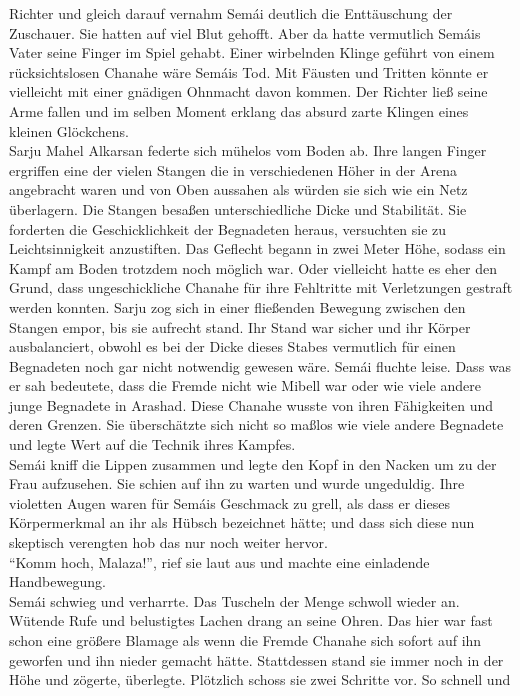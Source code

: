 Richter und gleich darauf vernahm Semái deutlich die Enttäuschung der Zuschauer. Sie hatten auf 
viel Blut gehofft. Aber da hatte vermutlich Semáis Vater seine Finger im Spiel gehabt. Einer 
wirbelnden Klinge geführt von einem rücksichtslosen Chanahe wäre Semáis Tod. Mit Fäusten und 
Tritten könnte er vielleicht mit einer gnädigen Ohnmacht davon kommen. Der Richter ließ seine Arme 
fallen und im selben Moment erklang das absurd zarte Klingen eines kleinen Glöckchens.\\
Sarju Mahel Alkarsan federte sich mühelos vom Boden ab. Ihre langen Finger 
ergriffen eine der vielen Stangen die in verschiedenen Höher in der Arena angebracht waren und von 
Oben aussahen als würden sie sich wie ein Netz überlagern. Die Stangen besaßen unterschiedliche 
Dicke und Stabilität. Sie forderten die Geschicklichkeit der Begnadeten heraus, versuchten sie zu 
Leichtsinnigkeit anzustiften. Das Geflecht begann in zwei Meter Höhe, sodass ein Kampf am Boden 
trotzdem noch möglich war. Oder vielleicht hatte es eher den Grund, dass ungeschickliche Chanahe 
für ihre Fehltritte mit Verletzungen gestraft werden konnten. Sarju zog sich in einer fließenden 
Bewegung zwischen den Stangen empor, bis sie aufrecht stand. Ihr Stand war sicher und ihr Körper 
ausbalanciert, obwohl es bei der Dicke dieses Stabes vermutlich für einen Begnadeten noch gar nicht 
notwendig gewesen wäre. Semái fluchte leise. Dass was er sah bedeutete, dass die Fremde nicht wie 
Mibell war oder wie viele andere junge Begnadete in Arashad. Diese Chanahe wusste von ihren 
Fähigkeiten und deren Grenzen. Sie überschätzte sich nicht so maßlos wie viele andere Begnadete und 
legte Wert auf die Technik ihres Kampfes.\\
Semái kniff die Lippen zusammen und legte den Kopf in den Nacken um zu der Frau aufzusehen. Sie 
schien auf ihn zu warten und wurde ungeduldig. Ihre violetten Augen waren für Semáis Geschmack zu 
grell, als dass er dieses Körpermerkmal an ihr als Hübsch bezeichnet hätte; und dass sich diese nun 
skeptisch verengten hob das nur noch weiter hervor.\\
``Komm hoch, Malaza!'', rief sie laut aus und machte eine einladende Handbewegung.\\
Semái schwieg und verharrte. Das Tuscheln der Menge schwoll wieder an. Wütende Rufe und belustigtes 
Lachen drang an seine Ohren. Das hier war fast schon eine größere Blamage als wenn die Fremde 
Chanahe sich sofort auf ihn geworfen und ihn nieder gemacht hätte. Stattdessen stand sie immer noch 
in der Höhe und zögerte, überlegte. Plötzlich schoss sie zwei Schritte vor. So schnell und 
